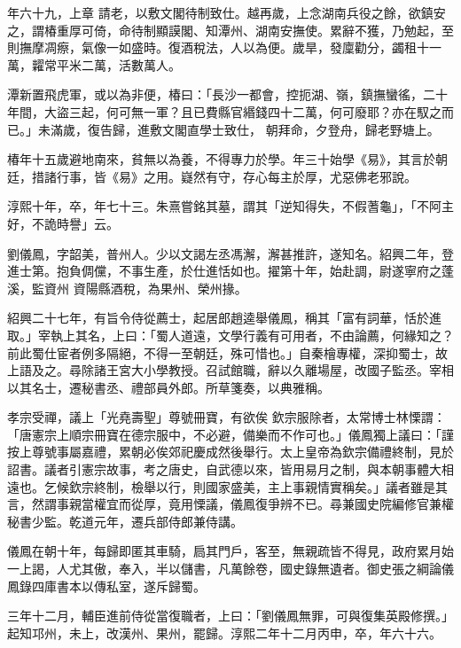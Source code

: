 \begin{pinyinscope}
 年六十九，上章
 請老，以敷文閣待制致仕。越再歲，上念湖南兵役之餘，欲鎮安之，謂椿重厚可倚，命待制顯謨閣、知潭州、湖南安撫使。累辭不獲，乃勉起，至則撫摩凋瘵，氣像一如盛時。復酒稅法，人以為便。歲旱，發廩勸分，蠲租十一萬，糶常平米二萬，活數萬人。



 潭新置飛虎軍，或以為非便，椿曰：「長沙一都會，控扼湖、嶺，鎮撫蠻徭，二十年間，大盜三起，何可無一軍？且已費縣官緡錢四十二萬，何可廢耶？亦在馭之而已。」未滿歲，復告歸，進敷文閣直學士致仕，
 朝拜命，夕登舟，歸老野塘上。



 椿年十五歲避地南來，貧無以為養，不得專力於學。年三十始學《易》，其言於朝廷，措諸行事，皆《易》之用。嶷然有守，存心每主於厚，尤惡佛老邪說。



 淳熙十年，卒，年七十三。朱熹嘗銘其墓，謂其「逆知得失，不假蓍龜」，「不阿主好，不詭時譽」云。



 劉儀鳳，字韶美，普州人。少以文謁左丞馮澥，澥甚推許，遂知名。紹興二年，登進士第。抱負倜儻，不事生產，於仕進恬如也。擢第十年，始赴調，尉遂寧府之蓬溪，監資州
 資陽縣酒稅，為果州、榮州掾。



 紹興二十七年，有旨令侍從薦士，起居郎趙逵舉儀鳳，稱其「富有詞華，恬於進取。」宰執上其名，上曰：「蜀人道遠，文學行義有可用者，不由論薦，何緣知之？前此蜀仕宦者例多隔絕，不得一至朝廷，殊可惜也。」自秦檜專權，深抑蜀士，故上語及之。尋除諸王宮大小學教授。召試館職，辭以久離場屋，改國子監丞。宰相以其名士，遷秘書丞、禮部員外郎。所草箋奏，以典雅稱。



 孝宗受禪，議上「光堯壽聖」尊號冊寶，有欲俟
 欽宗服除者，太常博士林慄謂：「唐憲宗上順宗冊寶在德宗服中，不必避，備樂而不作可也。」儀鳳獨上議曰：「謹按上尊號事屬嘉禮，累朝必俟郊祀慶成然後舉行。太上皇帝為欽宗備禮終制，見於詔書。議者引憲宗故事，考之唐史，自武德以來，皆用易月之制，與本朝事體大相遠也。乞候欽宗終制，檢舉以行，則國家盛美，主上事親情實稱矣。」議者雖是其言，然謂事親當權宜而從厚，竟用慄議，儀鳳復爭辨不已。尋兼國史院編修官兼權
 秘書少監。乾道元年，遷兵部侍郎兼侍講。



 儀鳳在朝十年，每歸即匿其車騎，扃其門戶，客至，無親疏皆不得見，政府累月始一上謁，人尤其傲，奉入，半以儲書，凡萬餘卷，國史錄無遺者。御史張之綱論儀鳳錄四庫書本以傳私室，遂斥歸蜀。



 三年十二月，輔臣進前侍從當復職者，上曰：「劉儀鳳無罪，可與復集英殿修撰。」起知邛州，未上，改漢州、果州，罷歸。淳熙二年十二月丙申，卒，年六十六。




\end{pinyinscope}
